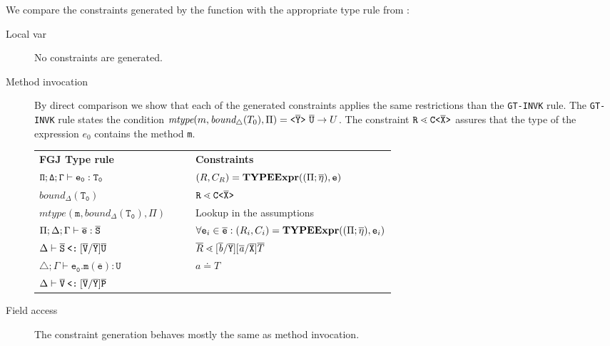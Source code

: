 \documentclass[a4paper,USenglish,cleveref, autoref, thm-restate, anonymous]{lipics-v2021}
\begin{document}
We compare the constraints generated by the \typeExpr function with the appropriate type rule from \TFGJ:
\begin{description}
  \item [Local var]
  No constraints are generated.
  \item[Method invocation]
By direct comparison we show that each of the generated constraints applies the same restrictions than the \texttt{GT-INVK} rule.
The \texttt{GT-INVK} rule states the condition $\textit{mtype}(m, \textit{bound}_\triangle(T_0), \Pi) = \mathtt{ \texttt{<} \overline{\tt Y} \texttt{>} }\ \overline{\tt U} \to U$.
The constraint $\texttt{R} \lessdot \mathtt{C \texttt{<} \overline{\tt X} \texttt{>} }$ assures that the type of the expression $e_0$ contains the method \texttt{m}.

\begin{small}
\begin{tabularx}{\linewidth}{lX|Xl}
  \textbf{FGJ Type rule} &&& \textbf{Constraints} \\
  $\mathtt{\Pi;\Delta;\Gamma \vdash e_0 : T_0 }$ &&&
    $({R}, C_R) = \textbf{TYPEExpr}(({\Pi} ;\overline{\mathtt{\eta}}), \texttt{e})$\\ 
  $\mathtt{\mathit{bound}_\Delta (T_0)}$ &&& $\texttt{R} \lessdot \mathtt{C \texttt{<} \overline{\tt X} \texttt{>} }$ \\
  $\mathtt{\mathit{mtype}(m, \mathit{bound}_\Delta (T_0), \Pi)}$ &&& Lookup in the assumptions \\
 $\Pi;\Delta;\Gamma \vdash \overline{\tt e} : \overline{\tt S}$ &&& $\forall \texttt{e}_i \in \overline{\tt e} : (R_i, C_i) = \textbf{TYPEExpr}(({\Pi} ;
 \overline{\mathtt{\eta}}), \texttt{e}_i)$\\
 $\Delta \vdash \overline{\tt S} \mathbin{\texttt{<:}}  [\overline{\tt V}/\overline{\tt Y}]\overline{\tt U}$ &&& $ \overline{R} \lessdot [\overline{\tt \mathit{ b }}/\overline{\tt Y}][\overline{\tt \mathit{ a }}/\overline{\tt X}]\overline{T}$\\
 $\triangle; \Gamma \vdash \mathtt{e_0.m(\overline{e}) : U }$ &&& $a \doteq T$ \\
 $\Delta \vdash \overline{\tt V} \mathbin{\texttt{<:}}  [\overline{\tt V}/\overline{\tt Y}]\overline{\tt P}$ &&& 
\end{tabularx}
\end{small}

 \item[Field access]
The constraint generation behaves mostly the same as method invocation.


\end{description}
\end{document}
